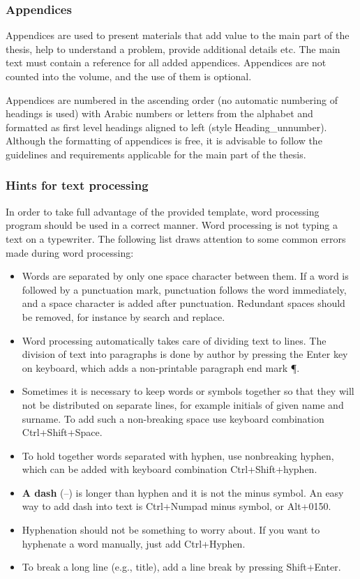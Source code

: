 \subsubsection{Appendices}
Appendices are used to present materials that add value to the main
part of the thesis, help to understand a problem, provide additional
details etc. The main text must contain a reference for all added
appendices. Appendices are not counted into the volume, and the use of
them is optional.

Appendices are numbered in the ascending order (no automatic numbering
of headings is used) with Arabic numbers or letters from the alphabet
and formatted as first level headings aligned to left (style
Heading\_unnumber). Although the formatting of appendices is free, it
is advisable to follow the guidelines and requirements applicable for
the main part of the thesis.

\subsubsection{Hints for text processing}

In order to take full advantage of the provided template, word
processing program should be used in a correct manner. Word processing
is not typing a text on a typewriter. The following list draws
attention to some common errors made during word processing:

\begin{itemize}
\item Words are separated by only one space character between them. If
  a word is followed by a punctuation mark, punctuation follows the word
  immediately, and a space character is added after
  punctuation. Redundant spaces should be removed, for instance by
  search and replace.

\item Word processing automatically takes care of dividing text to
  lines. The division of text into paragraphs is done by author by
  pressing the Enter key on keyboard, which adds a non-printable
  paragraph end mark ¶.

\item Sometimes it is necessary to keep words or symbols together so
  that they will not be distributed on separate lines, for example
  initials of given name and surname. To add such a non-breaking space
  use keyboard combination Ctrl+Shift+Space.

\item To hold together words separated with hyphen, use nonbreaking
  hyphen, which can be added with keyboard combination
  Ctrl+Shift+hyphen.

\item \textbf{A dash} (--) is longer than hyphen and it is not the minus symbol. An easy way to
  add dash into text is Ctrl+Numpad minus symbol, or Alt+0150.

\item Hyphenation should not be something to worry about. If you want to hyphenate a
  word manually, just add Ctrl+Hyphen.

\item To break a long line (e.g., title), add a line break by pressing Shift+Enter.
\end{itemize}
